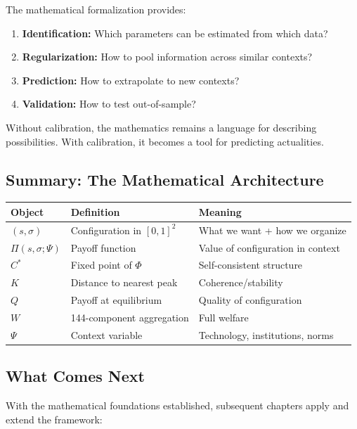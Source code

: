 The mathematical formalization provides:
\begin{enumerate}
    \item \textbf{Identification:} Which parameters can be estimated from which data?
    \item \textbf{Regularization:} How to pool information across similar contexts?
    \item \textbf{Prediction:} How to extrapolate to new contexts?
    \item \textbf{Validation:} How to test out-of-sample?
\end{enumerate}

Without calibration, the mathematics remains a language for describing possibilities.
With calibration, it becomes a tool for predicting actualities.

\subsection{Summary: The Mathematical Architecture}

\begin{center}
\renewcommand{\arraystretch}{1.3}
\begin{tabular}{lll}
\hline
\textbf{Object} & \textbf{Definition} & \textbf{Meaning} \\
\hline
$(s, \sigma)$ & Configuration in $[0,1]^2$ & What we want + how we organize \\
$\Pi(s, \sigma; \Psi)$ & Payoff function & Value of configuration in context \\
$C^*$ & Fixed point of $\Phi$ & Self-consistent structure \\
$K$ & Distance to nearest peak & Coherence/stability \\
$Q$ & Payoff at equilibrium & Quality of configuration \\
$W$ & 144-component aggregation & Full welfare \\
$\Psi$ & Context variable & Technology, institutions, norms \\
\hline
\end{tabular}
\end{center}

\subsection{What Comes Next}
\label{sec:ch8-next}

With the mathematical foundations established, subsequent chapters apply and extend the framework:

